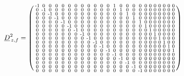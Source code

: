 \documentclass[pdftex,a4paper,parskip,listof=totoc,bibliography=totoc,onehalfspacing,12pt]{scrreprt}
\begin{document}
\begin{align*}
	\underline{D}_{\,z,f}^2 &= \begin{psmallmatrix}
\text{-}1 & 0 & 0 & 0 & 0 & 0 & 0 & 0 & 0 & 0 & 0 & 0 & 1 & 0 & 0 & 0 & 0 & 0 & 0 & 0 & 0 & 0 & 0 & 0 \\
0 & \text{-}1 & 0 & 0 & 0 & 0 & 0 & 0 & 0 & 0 & 0 & 0 & 0 & 1 & 0 & 0 & 0 & 0 & 0 & 0 & 0 & 0 & 0 & 0 \\
0 & 0 & \text{-}1 & 0 & 0 & 0 & 0 & 0 & 0 & 0 & 0 & 0 & 0 & 0 & 1 & 0 & 0 & 0 & 0 & 0 & 0 & 0 & 0 & 0 \\
0 & 0 & 0 & \text{-}1 & 0 & 0 & 0 & 0 & 0 & 0 & 0 & 0 & 0 & 0 & 0 & 1 & 0 & 0 & 0 & 0 & 0 & 0 & 0 & 0 \\
0 & 0 & 0 & 0 & \text{-}1 & 0 & 0 & 0 & 0 & 0 & 0 & 0 & 0 & 0 & 0 & 0 & 1 & 0 & 0 & 0 & 0 & 0 & 0 & 0 \\
0 & 0 & 0 & 0 & 0 & \text{-}1 & 0 & 0 & 0 & 0 & 0 & 0 & 0 & 0 & 0 & 0 & 0 & 1 & 0 & 0 & 0 & 0 & 0 & 0 \\
0 & 0 & 0 & 0 & 0 & 0 & \text{-}1 & 0 & 0 & 0 & 0 & 0 & 0 & 0 & 0 & 0 & 0 & 0 & 1 & 0 & 0 & 0 & 0 & 0 \\
0 & 0 & 0 & 0 & 0 & 0 & 0 & \text{-}1 & 0 & 0 & 0 & 0 & 0 & 0 & 0 & 0 & 0 & 0 & 0 & 1 & 0 & 0 & 0 & 0 \\
0 & 0 & 0 & 0 & 0 & 0 & 0 & 0 & \text{-}1 & 0 & 0 & 0 & 0 & 0 & 0 & 0 & 0 & 0 & 0 & 0 & 1 & 0 & 0 & 0 \\
0 & 0 & 0 & 0 & 0 & 0 & 0 & 0 & 0 & \text{-}1 & 0 & 0 & 0 & 0 & 0 & 0 & 0 & 0 & 0 & 0 & 0 & 1 & 0 & 0 \\
0 & 0 & 0 & 0 & 0 & 0 & 0 & 0 & 0 & 0 & \text{-}1 & 0 & 0 & 0 & 0 & 0 & 0 & 0 & 0 & 0 & 0 & 0 & 1 & 0 \\
0 & 0 & 0 & 0 & 0 & 0 & 0 & 0 & 0 & 0 & 0 & \text{-}1 & 0 & 0 & 0 & 0 & 0 & 0 & 0 & 0 & 0 & 0 & 0 & 1 \\
0 & 0 & 0 & 0 & 0 & 0 & 0 & 0 & 0 & 0 & 0 & 0 & \text{-}1 & 0 & 0 & 0 & 0 & 0 & 0 & 0 & 0 & 0 & 0 & 0 \\
0 & 0 & 0 & 0 & 0 & 0 & 0 & 0 & 0 & 0 & 0 & 0 & 0 & \text{-}1 & 0 & 0 & 0 & 0 & 0 & 0 & 0 & 0 & 0 & 0 \\
0 & 0 & 0 & 0 & 0 & 0 & 0 & 0 & 0 & 0 & 0 & 0 & 0 & 0 & \text{-}1 & 0 & 0 & 0 & 0 & 0 & 0 & 0 & 0 & 0 \\
0 & 0 & 0 & 0 & 0 & 0 & 0 & 0 & 0 & 0 & 0 & 0 & 0 & 0 & 0 & \text{-}1 & 0 & 0 & 0 & 0 & 0 & 0 & 0 & 0 \\
0 & 0 & 0 & 0 & 0 & 0 & 0 & 0 & 0 & 0 & 0 & 0 & 0 & 0 & 0 & 0 & \text{-}1 & 0 & 0 & 0 & 0 & 0 & 0 & 0 \\

\end{psmallmatrix}
\end{align*}
\end{document}
